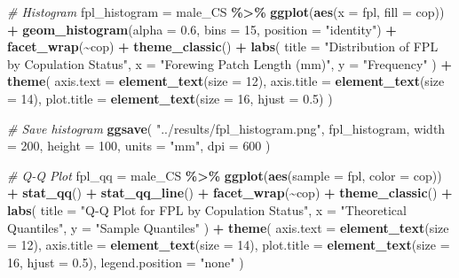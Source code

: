 \documentclass[
]{article}
\newenvironment{Shaded}{\begin{snugshade}}{\end{snugshade}}
\newcommand{\AttributeTok}[1]{\textcolor[rgb]{0.13,0.29,0.53}{#1}}
\newcommand{\CommentTok}[1]{\textcolor[rgb]{0.56,0.35,0.01}{\textit{#1}}}
\newcommand{\DecValTok}[1]{\textcolor[rgb]{0.00,0.00,0.81}{#1}}
\newcommand{\FloatTok}[1]{\textcolor[rgb]{0.00,0.00,0.81}{#1}}
\newcommand{\FunctionTok}[1]{\textcolor[rgb]{0.13,0.29,0.53}{\textbf{#1}}}
\newcommand{\NormalTok}[1]{#1}
\newcommand{\OtherTok}[1]{\textcolor[rgb]{0.56,0.35,0.01}{#1}}
\newcommand{\SpecialCharTok}[1]{\textcolor[rgb]{0.81,0.36,0.00}{\textbf{#1}}}
\newcommand{\StringTok}[1]{\textcolor[rgb]{0.31,0.60,0.02}{#1}}
\begin{document}
\begin{Shaded}
\begin{Highlighting}[]
\CommentTok{\# Histogram}
\NormalTok{fpl\_histogram }\OtherTok{=}\NormalTok{ male\_CS }\SpecialCharTok{\%\textgreater{}\%}
  \FunctionTok{ggplot}\NormalTok{(}\FunctionTok{aes}\NormalTok{(}\AttributeTok{x =}\NormalTok{ fpl, }\AttributeTok{fill =}\NormalTok{ cop)) }\SpecialCharTok{+}
  \FunctionTok{geom\_histogram}\NormalTok{(}\AttributeTok{alpha =} \FloatTok{0.6}\NormalTok{, }\AttributeTok{bins =} \DecValTok{15}\NormalTok{, }\AttributeTok{position =} \StringTok{"identity"}\NormalTok{) }\SpecialCharTok{+}
  \FunctionTok{facet\_wrap}\NormalTok{(}\SpecialCharTok{\textasciitilde{}}\NormalTok{cop) }\SpecialCharTok{+}
  \FunctionTok{theme\_classic}\NormalTok{() }\SpecialCharTok{+}
  \FunctionTok{labs}\NormalTok{(}
    \AttributeTok{title =} \StringTok{"Distribution of FPL by Copulation Status"}\NormalTok{,}
    \AttributeTok{x =} \StringTok{"Forewing Patch Length (mm)"}\NormalTok{,}
    \AttributeTok{y =} \StringTok{"Frequency"}
\NormalTok{  ) }\SpecialCharTok{+}
  \FunctionTok{theme}\NormalTok{(}
    \AttributeTok{axis.text =} \FunctionTok{element\_text}\NormalTok{(}\AttributeTok{size =} \DecValTok{12}\NormalTok{),}
    \AttributeTok{axis.title =} \FunctionTok{element\_text}\NormalTok{(}\AttributeTok{size =} \DecValTok{14}\NormalTok{),}
    \AttributeTok{plot.title =} \FunctionTok{element\_text}\NormalTok{(}\AttributeTok{size =} \DecValTok{16}\NormalTok{, }\AttributeTok{hjust =} \FloatTok{0.5}\NormalTok{)}
\NormalTok{  )}

\CommentTok{\# Save histogram}
\FunctionTok{ggsave}\NormalTok{(}
  \StringTok{"../results/fpl\_histogram.png"}\NormalTok{,}
\NormalTok{  fpl\_histogram,}
  \AttributeTok{width =} \DecValTok{200}\NormalTok{,}
  \AttributeTok{height =} \DecValTok{100}\NormalTok{,}
  \AttributeTok{units =} \StringTok{"mm"}\NormalTok{,}
  \AttributeTok{dpi =} \DecValTok{600}
\NormalTok{)}

\CommentTok{\# Q{-}Q Plot}
\NormalTok{fpl\_qq }\OtherTok{=}\NormalTok{ male\_CS }\SpecialCharTok{\%\textgreater{}\%}
  \FunctionTok{ggplot}\NormalTok{(}\FunctionTok{aes}\NormalTok{(}\AttributeTok{sample =}\NormalTok{ fpl, }\AttributeTok{color =}\NormalTok{ cop)) }\SpecialCharTok{+}
  \FunctionTok{stat\_qq}\NormalTok{() }\SpecialCharTok{+}
  \FunctionTok{stat\_qq\_line}\NormalTok{() }\SpecialCharTok{+}
  \FunctionTok{facet\_wrap}\NormalTok{(}\SpecialCharTok{\textasciitilde{}}\NormalTok{cop) }\SpecialCharTok{+}
  \FunctionTok{theme\_classic}\NormalTok{() }\SpecialCharTok{+}
  \FunctionTok{labs}\NormalTok{(}
    \AttributeTok{title =} \StringTok{"Q{-}Q Plot for FPL by Copulation Status"}\NormalTok{,}
    \AttributeTok{x =} \StringTok{"Theoretical Quantiles"}\NormalTok{,}
    \AttributeTok{y =} \StringTok{"Sample Quantiles"}
\NormalTok{  ) }\SpecialCharTok{+}
  \FunctionTok{theme}\NormalTok{(}
    \AttributeTok{axis.text =} \FunctionTok{element\_text}\NormalTok{(}\AttributeTok{size =} \DecValTok{12}\NormalTok{),}
    \AttributeTok{axis.title =} \FunctionTok{element\_text}\NormalTok{(}\AttributeTok{size =} \DecValTok{14}\NormalTok{),}
    \AttributeTok{plot.title =} \FunctionTok{element\_text}\NormalTok{(}\AttributeTok{size =} \DecValTok{16}\NormalTok{, }\AttributeTok{hjust =} \FloatTok{0.5}\NormalTok{),}
    \AttributeTok{legend.position =} \StringTok{"none"}
\NormalTok{  )}


\end{Highlighting}
\end{Shaded}
\end{document}
